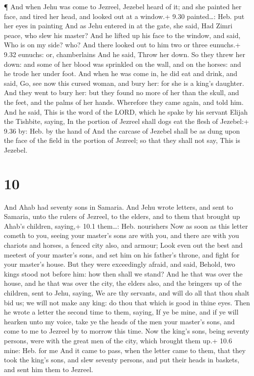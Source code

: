  ¶ And when Jehu was come to Jezreel, Jezebel heard of it;
and she painted her face, and tired her head, and looked out at a
window.+ 9.30 painted\ldots: Heb. put her eyes in painting 
And as Jehu entered in at the gate, she said, Had Zimri peace, who slew
his master?  And he lifted up his face to the window, and
said, Who is on my side? who? And there looked out to him two or three
eunuchs.+ 9.32 eunuchs: or, chamberlains  And he said,
Throw her down. So they threw her down: and some of her blood was
sprinkled on the wall, and on the horses: and he trode her under foot.
 And when he was come in, he did eat and drink, and said,
Go, see now this cursed woman, and bury her: for she is a king's
daughter.  And they went to bury her: but they found no
more of her than the skull, and the feet, and the palms of her hands.
 Wherefore they came again, and told him. And he said, This
is the word of the LORD, which he spake by his servant Elijah the
Tishbite, saying, In the portion of Jezreel shall dogs eat the flesh of
Jezebel:+ 9.36 by: Heb. by the hand of  And the carcase of
Jezebel shall be as dung upon the face of the field in the portion of
Jezreel; so that they shall not say, This is Jezebel.

\hypertarget{section-9}{%
\section{10}\label{section-9}}

 And Ahab had seventy sons in Samaria. And Jehu wrote
letters, and sent to Samaria, unto the rulers of Jezreel, to the elders,
and to them that brought up Ahab's children, saying,+ 10.1 them\ldots:
Heb. nourishers  Now as soon as this letter cometh to you,
seeing your master's sons are with you, and there are with you chariots
and horses, a fenced city also, and armour;  Look even out
the best and meetest of your master's sons, and set him on his father's
throne, and fight for your master's house.  But they were
exceedingly afraid, and said, Behold, two kings stood not before him:
how then shall we stand?  And he that was over the house,
and he that was over the city, the elders also, and the bringers up of
the children, sent to Jehu, saying, We are thy servants, and will do all
that thou shalt bid us; we will not make any king: do thou that which is
good in thine eyes.  Then he wrote a letter the second time
to them, saying, If ye be mine, and if ye will hearken unto my voice,
take ye the heads of the men your master's sons, and come to me to
Jezreel by to morrow this time. Now the king's sons, being seventy
persons, were with the great men of the city, which brought them up.+
10.6 mine: Heb. for me  And it came to pass, when the letter
came to them, that they took the king's sons, and slew seventy persons,
and put their heads in baskets, and sent him them to Jezreel.

